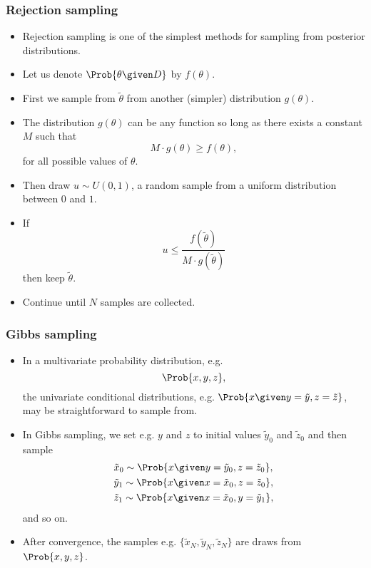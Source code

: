 \documentclass{slides}
\begin{document}
\begin{frame}
	\frametitle{Rejection sampling}
	\begin{itemize}
		\item Rejection sampling is one of the simplest methods for sampling from posterior distributions.
		\item Let us denote $\Prob{\theta\given D}$ by $f(\theta)$.
		\item First we sample from $\tilde{\theta}$ from another (simpler) distribution $g(\theta)$.
		\item The distribution $g(\theta)$ can be any function so long as there exists a constant $M$ such that 
			\[ M \cdot g(\theta) \geq f(\theta),\]
			for all possible values of $\theta$.
		\item Then draw $u \sim U(0, 1)$, a random sample from a uniform distribution between $0$ and $1$.
		\item If\[ u \leq \frac{f(\tilde{\theta})}{M \cdot g(\tilde{\theta})}\]
			then keep $\tilde{\theta}$. 
		\item Continue until $N$ samples are collected.

	\end{itemize}
\end{frame}

\begin{frame}
	\frametitle{Gibbs sampling}
	\begin{itemize}
		\item In a multivariate probability distribution, e.g. 
			\[\Prob{x, y, z},\]
			the univariate conditional distributions, e.g. $\Prob{x
			\given y=\tilde{y}, z=\tilde{z}}$, may be
			straightforward to sample from.
		\item In Gibbs sampling, we set e.g. $y$ and $z$ to initial values $\tilde{y}_0$ and $\tilde{z}_0$ and then sample
			\begin{align*}
				&\tilde{x}_0 \sim \Prob{x \given y=\tilde{y}_0, z=\tilde{z}_0},\\
				&\tilde{y}_1 \sim \Prob{x \given x=\tilde{x}_0, z=\tilde{z}_0},\\
				&\tilde{z}_1 \sim \Prob{x \given x=\tilde{x}_0, y=\tilde{y}_1},
			\end{align*}
		and so on.
	\item After convergence, the samples e.g. $\{\tilde{x}_N, \tilde{y}_N, \tilde{z}_N\}$ are draws from $\Prob{x, y, z}$.
	\end{itemize}
\end{frame}
\end{document}
